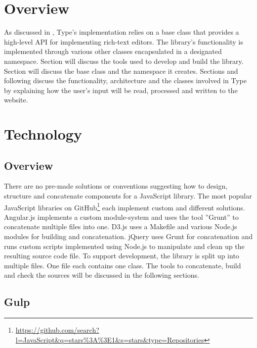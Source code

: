 

\section{Overview}

As discussed in , Type's implementation relies on a base class that provides a high-level API for implementing rich-text editors. The library's functionality is implemented through various other classes encapsulated in a designated namespace. Section  will discuss the tools used to develop and build the library. Section  will discuss the base class and the namespace it creates. Sections  and following discuss the functionality, architecture and the classes involved in Type by explaining how the user's input will be read, processed and written to the website.

\section{Technology}
\label{sec:impl_technology}

\subsection{Overview}

There are no pre-made solutions or conventions suggesting how to design, structure and concatenate components for a JavaScript library. The most popular JavaScript libraries on GitHub\footnote{\url{https://github.com/search?l=JavaScript\&q=stars\%3A\%3E1\&s=stars\&type=Repositories}} each implement custom and different solutions. Angular.js implements a custom module-system and uses the tool ''Grunt'' to concatenate multiple files into one. D3.js uses a Makefile and various Node.js modules for building and concatenation. jQuery uses Grunt for concatenation and runs custom scripts implemented using Node.js to manipulate and clean up the resulting source code file. To support development, the library is split up into multiple files. One file each contains one class. The tools to concatenate, build and check the sources will be discussed in the following sections.

\subsection{Gulp}

